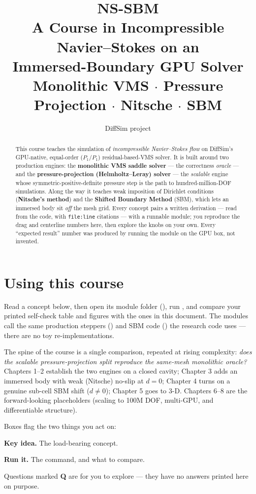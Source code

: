 \documentclass[11pt]{report}
\title{\textbf{NS-SBM}\\[4pt]
  \large A Course in Incompressible Navier--Stokes on an\\
  Immersed-Boundary GPU Solver\\[2pt]
  \normalsize Monolithic VMS \; $\cdot$ \; Pressure Projection \; $\cdot$ \; Nitsche \; $\cdot$ \; SBM}
\author{DiffSim project}
\date{}
\begin{document}
\maketitle

\begin{abstract}
\noindent This course teaches the simulation of \emph{incompressible
Navier--Stokes flow} on DiffSim's GPU-native, equal-order ($P_1/P_1$)
residual-based-VMS solver. It is built around two production engines: the
\textbf{monolithic VMS saddle solver} --- the correctness \emph{oracle} ---
and the \textbf{pressure-projection (Helmholtz--Leray) solver} --- the
\emph{scalable} engine whose symmetric-positive-definite pressure step is
the path to hundred-million-DOF simulations. Along the way it teaches weak
imposition of Dirichlet conditions (\textbf{Nitsche's method}) and the
\textbf{Shifted Boundary Method} (SBM), which lets an immersed body sit
\emph{off} the mesh grid. Every concept pairs a written derivation --- read
from the code, with \texttt{file:line} citations --- with a runnable module;
you reproduce the drag and centerline numbers here, then explore the knobs
on your own. Every ``expected result'' number was produced by running the
module on the GPU box, not invented.
\end{abstract}

\tableofcontents

\chapter{Using this course}
Read a concept below, then open its module folder
(), run , and
compare your printed self-check table and figures with the ones in this
document. The modules call the same production steppers
() and SBM code () the
research code uses --- there are no toy re-implementations.

The spine of the course is a single comparison, repeated at rising
complexity: \emph{does the scalable pressure-projection split reproduce
the same-mesh monolithic oracle?} Chapters 1--2 establish the two engines
on a closed cavity; Chapter 3 adds an immersed body with weak (Nitsche)
no-slip at $d=0$; Chapter 4 turns on a genuine sub-cell SBM shift
($d\neq0$); Chapter 5 goes to 3-D. Chapters 6--8 are the forward-looking
placeholders (scaling to 100M DOF, multi-GPU, and differentiable
structure).

Boxes flag the two things you act on:
\begin{keybox}\textbf{Key idea.} The load-bearing concept.\end{keybox}
\begin{runbox}\textbf{Run it.} The command, and what to compare.\end{runbox}
Questions marked \textbf{\textcolor{purple!70!black}{Q}} are for you to
explore --- they have no answers printed here on purpose.
\end{document}
